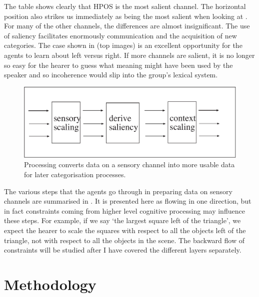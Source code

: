 The table shows clearly that HPOS is the most salient channel. 
The horizontal position also strikes us immediately 
as being the most salient when looking at  . 
For many of the other channels, the differences are
almost insignificant. The use of saliency facilitates 
enormously communication and the acquisition of new categories. 
The case shown in  (top images) is an excellent opportunity 
for the agents to learn about left versus right. If more 
channels are salient, it is no longer so easy for the 
hearer to guess what meaning might have been used by the 
speaker and so incoherence would slip into the group's lexical
system. 

\begin{figure}[htbp]
  \centerline{\includegraphics[width=.65\textwidth]{chap3/figs/scaling}}
\caption{\label{scaling} Processing converts data on 
a sensory channel into more usable data for later categorisation processes.}
\end{figure}

The various steps that the agents go through
in preparing data on sensory channels are summarised in .
It is presented here as flowing in one direction, but in fact 
constraints coming from higher level cognitive processing may 
influence these steps. For example, if we say `the largest square 
left of the triangle', we expect the hearer to scale the squares
with respect to all the objects left of the triangle, not with 
respect to all the objects in the scene. The backward flow of 
constraints will be studied after I have covered the different 
layers separately. 

\section{Methodology}

